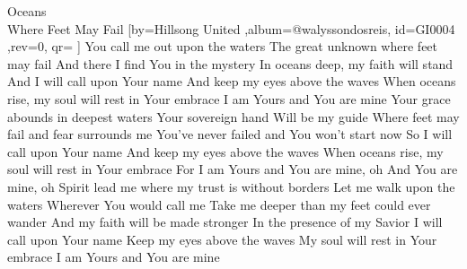\beginsong
{Oceans\\Where Feet May Fail %
}[by={Hillsong United  %
},album={@walyssondosreis},
id={GI0004 %
},rev={0}, %
qr={ %
}]
\beginverse
You call me out upon the waters
The great unknown where feet may fail
And there I find You in the mystery
In oceans deep, my faith will stand
\endverse
\beginchorus
And I will call upon Your name
And keep my eyes above the waves
When oceans rise, my soul will rest in Your embrace
I am Yours and You are mine
\endchorus
\beginverse
Your grace abounds in deepest waters
Your sovereign hand
Will be my guide
Where feet may fail and fear surrounds me
You've never failed and You won't start now
\endverse
\beginchorus
So I will call upon Your name
And keep my eyes above the waves
When oceans rise, my soul will rest in Your embrace
For I am Yours and You are mine, oh
And You are mine, oh
\endchorus
\beginverse
Spirit lead me where my trust is without borders
Let me walk upon the waters
Wherever You would call me
Take me deeper than my feet could ever wander
And my faith will be made stronger
In the presence of my Savior
\endverse
\beginchorus
I will call upon Your name
Keep my eyes above the waves
My soul will rest in Your embrace
I am Yours and You are mine
\endchorus

